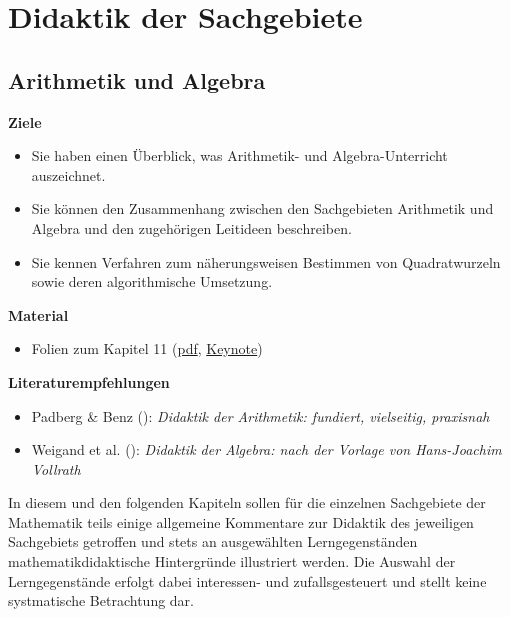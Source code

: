 \documentclass[
]{scrbook}
\providecommand{\tightlist}{%
  \setlength{\itemsep}{0pt}\setlength{\parskip}{0pt}}
\renewenvironment{quote}{
  \list{}{
	\leftmargin0.2cm   %
    \rightmargin\leftmargin
      	\def\FrameCommand
    {%
        {\color{quoteColor}\vrule width 2pt}%
        \hspace{0pt}%
    }%
    \MakeFramed{\advance \hsize -\width \FrameRestore}    \color{quoteColor}
    }
  \item\relax
}
{\endlist\color{black}\endMakeFramed}
\theoremstyle{definition}
\theoremstyle{definition}
\theoremstyle{definition}
\theoremstyle{definition}
\theoremstyle{remark}
\begin{document}
\part*{Didaktik der Sachgebiete}\label{part-didaktik-der-sachgebiete}

\chapter{Arithmetik und Algebra}\label{arithmetik-und-algebra}

\begin{quote}
\textbf{Ziele}

\begin{itemize}
\tightlist
\item
  Sie haben einen Überblick, was Arithmetik- und Algebra-Unterricht auszeichnet.\\
\item
  Sie können den Zusammenhang zwischen den Sachgebieten Arithmetik und Algebra und den zugehörigen Leitideen beschreiben.\\
\item
  Sie kennen Verfahren zum näherungsweisen Bestimmen von Quadratwurzeln sowie deren algorithmische Umsetzung.
\end{itemize}

\textbf{Material}

\begin{itemize}
\tightlist
\item
  Folien zum Kapitel 11 (\href{files/Stoffdidaktik2023-11-ArithmetikUndAlgebra.pdf}{pdf}, \href{files/Stoffdidaktik2023-11-ArithmetikUndAlgebra.key}{Keynote})
\end{itemize}

\textbf{Literaturempfehlungen}

\begin{itemize}
\tightlist
\item
  Padberg \& Benz (): \emph{Didaktik der Arithmetik: fundiert, vielseitig, praxisnah}
\item
  Weigand et al. (): \emph{Didaktik der Algebra: nach der Vorlage von Hans-Joachim Vollrath}
\end{itemize}
\end{quote}

In diesem und den folgenden Kapiteln sollen für die einzelnen Sachgebiete der Mathematik teils einige allgemeine Kommentare zur Didaktik des jeweiligen Sachgebiets getroffen und stets an ausgewählten Lerngegenständen mathematikdidaktische Hintergründe illustriert werden. Die Auswahl der Lerngegenstände erfolgt dabei interessen- und zufallsgesteuert und stellt keine systmatische Betrachtung dar.
\end{document}

